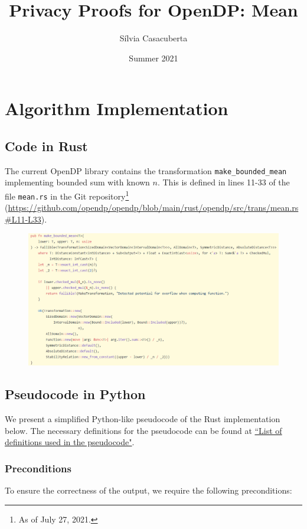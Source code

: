 \documentclass[11pt,a4paper]{article}
\title{Privacy Proofs for OpenDP: Mean}
\author{S\'ilvia Casacuberta}
\date{Summer 2021}
\theoremstyle{definition}
\begin{document}
\maketitle

\tableofcontents

\section{Algorithm Implementation}
\subsection{Code in Rust}
The current OpenDP library contains the transformation \texttt{make\_bounded\_mean} implementing bounded sum with known $n$. This is defined in lines 11-33 of the file \texttt{mean.rs} in the Git repository\footnote{As of July 27, 2021.} (\url{https://github.com/opendp/opendp/blob/main/rust/opendp/src/trans/mean.rs#L11-L33}).

\begin{figure}[ht]
    \includegraphics[width=15cm]{mean_rust.png}
    \centering
    \label{fig:code}
\end{figure}


\subsection{Pseudocode in Python}
We present a simplified Python-like pseudocode of the Rust implementation below. The necessary definitions for the pseudocode can be found at \href{https://www.overleaf.com/project/60d215bf90b337ac02200a99}{``List of definitions used in the pseudocode"}.

\subsubsection*{Preconditions}
To ensure the correctness of the output, we require the following preconditions:
\end{document}
